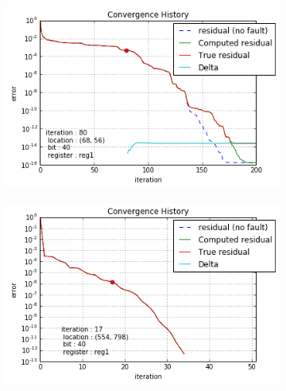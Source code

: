 \begin{figure}[h]
\begin{minipage}[b]{0.48\linewidth}
\begin{subfigure}[t]{\linewidth}
		\caption{}\label{fig:gre_216a_conv_hist_location_1}
	\end{subfigure}
    \quad
    \begin{subfigure}[t]{\linewidth}
		\centering
		\includegraphics[width=\linewidth]{figures/gre_216a/convergence_history_location_2.png}
		\caption{}\label{fig:gre_216a_conv_hist_location_2}
	\end{subfigure}
    \end{minipage}
    \quad
    \begin{minipage}[b]{0.48\linewidth}
    	\begin{subfigure}[t]{\linewidth}
		\centering
		\includegraphics[width=\linewidth]{figures/pores_2/convergence_history_location_0.png}
		\caption{}\label{fig:pores_2_conv_hist_location_0}		
	\end{subfigure}
	\quad
	\begin{subfigure}[t]{\linewidth}

\end{subfigure}
\end{minipage}
\end{figure}
